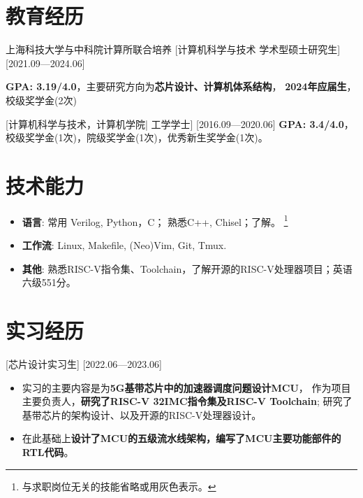 \documentclass{resume}
\begin{document}

\ResumeTitle

\section{教育经历}
\ResumeItem
{上海科技大学与中科院计算所联合培养}
[\textnormal{计算机科学与技术}  学术型硕士研究生]
[2021.09—2024.06]

\textbf{GPA: 3.19/4.0}，主要研究方向为\textbf{芯片设计、计算机体系结构}，
\textbf{2024年应届生}，校级奖学金(2次)

[\textnormal{计算机科学与技术，计算机学院|} 工学学士]
[2016.09—2020.06]
\textbf{GPA: 3.4/4.0}，校级奖学金(1次)，院级奖学金(1次)，优秀新生奖学金(1次)。

\section{技术能力}
\begin{itemize}
  \item \textbf{语言}: 常用 Verilog, Python，C； 熟悉C++, Chisel；了解。
      \footnote{与求职岗位无关的技能省略或用灰色表示。}
  \item \textbf{工作流}: Linux, Makefile, (Neo)Vim, Git, Tmux.
  \item \textbf{其他}: 熟悉RISC-V指令集、Toolchain，了解开源的RISC-V处理器项目；英语六级551分。
\end{itemize}

\section{实习经历}

[芯片设计实习生]
[2022.06—2023.06] 
\begin{itemize}
    \item 实习的主要内容是为\textbf{5G基带芯片中的加速器调度问题设计MCU}，
        作为项目主要负责人，\textbf{研究了RISC-V 32IMC指令集及RISC-V Toolchain};
        研究了基带芯片的架构设计、以及开源的RISC-V处理器设计。
    \item 在此基础上\textbf{设计了MCU的五级流水线架构，编写了MCU主要功能部件的RTL代码}。
\end{itemize}
\end{document}

